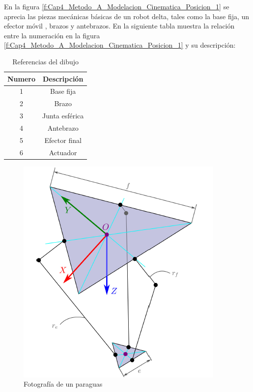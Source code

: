  

        En la figura \ref{f:Cap4_Metodo_A_Modelacion_Cinematica_Posicion_1} se aprecia las piezas mecánicas básicas de un robot delta, tales como la  base fija, un efector móvil , brazos y antebrazos. En la siguiente tabla muestra la relación entre la numeración en la figura \ref{f:Cap4_Metodo_A_Modelacion_Cinematica_Posicion_1} y su descripción:
        
        \begin{table}[h]
            \centering
            \begin{tabular}{c c}
            \hline
                \textbf{Numero}& \textbf{Descripción} \\ 
            \hline             \hline
             1 & Base fija \\
            \hline
             2 & Brazo \\
            \hline
             3 & Junta esférica \\
            \hline
             4 & Antebrazo\\
            \hline
             5 & Efector final \\
             \hline
             6 & Actuador  \\
             \hline
            \end{tabular}
           \caption{Referencias del dibujo}
           \label{tab:cap4_tabla_1}
        \end{table}

        \newpage
        
        \begin{figure}[htb]
             \centering
             \includegraphics[width=0.6\linewidth]{Main/Chapter4/Images4/Metodo_A_Modelacion_Cinematica_Posicion_2.png}
              \caption{Fotografía de un paraguas}
              \label{f:Cap4_Metodo_A_Modelacion_Cinematica_Posicion_2}
        \end{figure}
        
